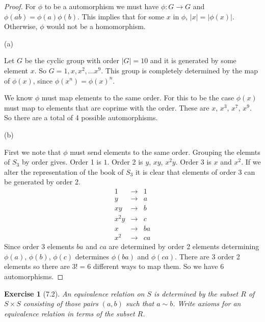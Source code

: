\documentclass[12pt,leqno]{article}
\numberwithin{equation}{section}
\newtheorem*{exer}{Exercise}
\theoremstyle{definition}
\begin{document}
\begin{proof}[Proof]

    For $\phi$ to be a automorphism we must have $\phi : G \rightarrow G$ and $\phi(ab) = \phi(a) \phi(b)$.
    This implies that for some $x$ in $\phi$, $\vert x \vert = \vert \phi(x) \vert$. Otherwise, $\phi$ would
    not be a homomorphism. 

\item[(a)]

    Let $G$ be the cyclic group with order $\vert G \vert = 10$ and it is generated by
    some element $x$. So  $G = {1, x, x^2, \dots x^9}$. This group is completely determined
    by the map of $\phi(x)$, since $\phi(x^n) = \phi(x)^n$. 

    We know $\phi$ must map elements to the same order. For this to be the case $\phi(x)$ must map to
    elements that are coprime with the order. These are $x$, $x^3$, $x^7$, $x^9$. So there 
    are a total of 4 possible automorphisms.

\item[(b)]

    First we note that $\phi$ must send elements to the same order. Grouping
    the elemnts of $S_3$ by order gives. Order 1 is $1$. Order 2 is $y$, $xy$, $x^2y$. 
    Order 3 is $x$ and $x^2$. 
    If we alter the representation of the book of $S_3$ it is clear that 
    elements of order 3 can be generated by order 2.
    $$
    \begin{array}{ccc}
        1 & \rightarrow & 1 \\
        y & \rightarrow & a \\
        xy & \rightarrow & b \\
        x^2y & \rightarrow & c \\
        x & \rightarrow & ba    \\
        x^2 & \rightarrow & ca
    \end{array}
    $$
    Since order 3 elements $ba$ and $ca$ are determined by order 2 elements
    determining $\phi(a)$, $\phi(b)$, $\phi(c)$ determines $\phi(ba)$ and $\phi(ca)$.
    There are 3 order 2 elements so there are $3! = 6$ different ways to map them. 
    So we have 6 automorphisms.


\end{proof}


\begin{exer}[7.2]An equivalence relation on $S$ is determined by the subset $R$
    of $S \times S$ consisting of those pairs $(a,b)$ such that $a \sim b$.
    Write axioms for an equivalence relation in terms of the subset $R$.

\end{exer}
\end{document}
